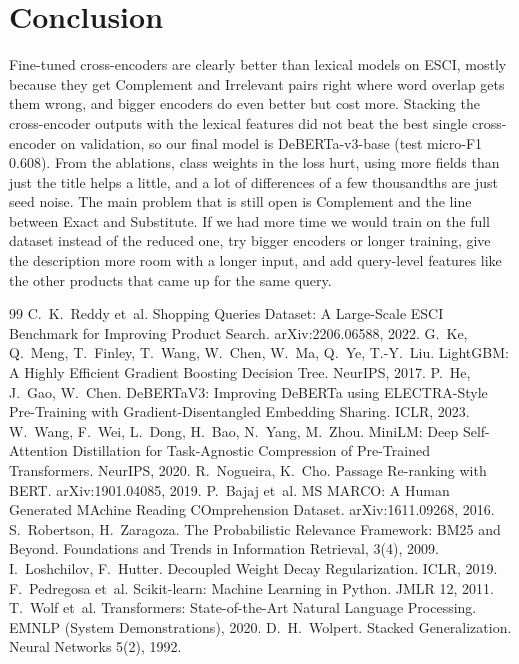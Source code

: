 \documentclass[11pt]{article}
\begin{document}
\section{Conclusion}
Fine-tuned cross-encoders are clearly better than lexical models on ESCI, mostly because they get Complement and Irrelevant pairs right where word overlap gets them wrong, and bigger encoders do even better but cost more.
Stacking the cross-encoder outputs with the lexical features did not beat the best single cross-encoder on validation, so our final model is DeBERTa-v3-base (test micro-F1 0.608).
From the ablations, class weights in the loss hurt, using more fields than just the title helps a little, and a lot of differences of a few thousandths are just seed noise.
The main problem that is still open is Complement and the line between Exact and Substitute. If we had more time we would train on the full dataset instead of the reduced one, try bigger encoders or longer training, give the description more room with a longer input, and add query-level features like the other products that came up for the same query.

\begin{thebibliography}{99}\small
{} C.~K.~Reddy et~al. Shopping Queries Dataset: A Large-Scale ESCI Benchmark for Improving Product Search. arXiv:2206.06588, 2022.
 G.~Ke, Q.~Meng, T.~Finley, T.~Wang, W.~Chen, W.~Ma, Q.~Ye, T.-Y.~Liu. LightGBM: A Highly Efficient Gradient Boosting Decision Tree. NeurIPS, 2017.
 P.~He, J.~Gao, W.~Chen. DeBERTaV3: Improving DeBERTa using ELECTRA-Style Pre-Training with Gradient-Disentangled Embedding Sharing. ICLR, 2023.
 W.~Wang, F.~Wei, L.~Dong, H.~Bao, N.~Yang, M.~Zhou. MiniLM: Deep Self-Attention Distillation for Task-Agnostic Compression of Pre-Trained Transformers. NeurIPS, 2020.
 R.~Nogueira, K.~Cho. Passage Re-ranking with BERT. arXiv:1901.04085, 2019.
 P.~Bajaj et~al. MS MARCO: A Human Generated MAchine Reading COmprehension Dataset. arXiv:1611.09268, 2016.
 S.~Robertson, H.~Zaragoza. The Probabilistic Relevance Framework: BM25 and Beyond. Foundations and Trends in Information Retrieval, 3(4), 2009.
 I.~Loshchilov, F.~Hutter. Decoupled Weight Decay Regularization. ICLR, 2019.
 F.~Pedregosa et~al. Scikit-learn: Machine Learning in Python. JMLR 12, 2011.
 T.~Wolf et~al. Transformers: State-of-the-Art Natural Language Processing. EMNLP (System Demonstrations), 2020.
 D.~H.~Wolpert. Stacked Generalization. Neural Networks 5(2), 1992.
\end{thebibliography}
\end{document}
